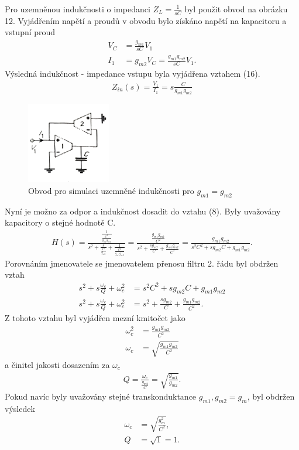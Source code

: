 \documentclass[twoside]{article}
\begin{document}
\noindent Pro uzemněnou indukčnosti o impedanci $Z_L = \frac{1}{sC}$ byl použit obvod na obrázku 12. Vyjádřením napětí a proudů v obvodu bylo získáno napětí na kapacitoru a vstupní proud
\begin{align}
V_C &= \frac{g_{m1}}{sC}V_1 \\
I_1 &= g_{m2}V_C = \frac{g_{m1}g_{m2}}{sC}V_1.
\end{align}
Výsledná indukčnost - impedance vstupu byla vyjádřena vztahem (16).
\begin{align}
Z_{in}(s) = \frac{V_1}{I_1} = s\frac{C}{g_{m1}g_{m2}}
\end{align}
\begin{figure}[H]
\centering
\includegraphics[scale=1]{image12.png}
\caption{Obvod pro simulaci uzemněné indukčnosti pro $g_{m1} = g_{m2}$\cite{8}}
\end{figure}
\noindent Nyní je možno za odpor a indukčnost dosadit do vztahu (8). Byly uvažovány kapacitory o stejné hodnotě C.
\begin{align}
H(s) = \frac{\frac{1}{\frac{C^2}{g_{m1}g_{m2}}}}{s^2 + \frac{s}{\frac{C}{g_{m2}}} + \frac{1}{\frac{C^2}{g_{m1}g_{m2}}}} = \frac{\frac{g_{m1}g_{m2}}{C^2}}{s^2 + \frac{sg_{m2}}{C} + \frac{g_{m1}g_{m2}}{C^2}} = \frac{g_{m1}g_{m2}}{s^2C^2 + sg_{m2}C + g_{m1}g_{m2}}.
\end{align}
Porovnáním jmenovatele se jmenovatelem přenosu filtru 2. řádu byl obdržen vztah
\begin{align}
s^2 + s\frac{\omega _c}{Q} + \omega _c^2 &= s^2C^2 + sg_{m2}C + g_{m1}g_{m2}\\
s^2 + s\frac{\omega _c}{Q} + \omega _c^2 &= s^2 + \frac{sg_{m2}}{C} + \frac{g_{m1}g_{m2}}{C^2}.
\end{align}
Z tohoto vztahu byl vyjádřen mezní kmitočet jako 
\begin{align}
\omega _c^2 &= \frac{g_{m1}g_{m2}}{C^2} \\
\omega _c &= \sqrt{\frac{g_{m1}g_{m2}}{C^2}}
\end{align}
a činitel jakosti dosazením za $\omega _c$
\begin{align}
Q = \frac{\omega _c}{\frac{g_{m2}}{C}} = \sqrt{\frac{g_{m1}}{g_{m2}}}.
\end{align}
Pokud navíc byly uvažovány stejné transkonduktance $g_{m1},g_{m2} = g_m$, byl obdržen výsledek
\begin{align}
\omega _c &= \sqrt{\frac{g_m^2}{C^2}},\\
Q &= \sqrt{1} = 1.
\end{align}
\newpage
\end{document}

